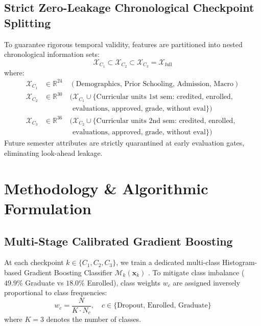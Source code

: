 \documentclass[conference]{IEEEtran}
\begin{document}
\subsection{Strict Zero-Leakage Chronological Checkpoint Splitting}
To guarantee rigorous temporal validity, features are partitioned into nested chronological information sets:
\begin{equation}
    \mathcal{X}_{C_1} \subset \mathcal{X}_{C_2} \subset \mathcal{X}_{C_3} = \mathcal{X}_{\text{full}}
\end{equation}
where:
\begin{align}
    \mathcal{X}_{C_1} &\in \mathbb{R}^{24} \quad (\text{Demographics, Prior Schooling, Admission, Macro}) \nonumber \\
    \mathcal{X}_{C_2} &\in \mathbb{R}^{30} \quad (\mathcal{X}_{C_1} \cup \{\text{Curricular units 1st sem: credited, enrolled,} \nonumber \\
    &\quad\quad\quad\quad \text{evaluations, approved, grade, without eval}\}) \nonumber \\
    \mathcal{X}_{C_3} &\in \mathbb{R}^{36} \quad (\mathcal{X}_{C_2} \cup \{\text{Curricular units 2nd sem: credited, enrolled,} \nonumber \\
    &\quad\quad\quad\quad \text{evaluations, approved, grade, without eval}\}) \nonumber
\end{align}
Future semester attributes are strictly quarantined at early evaluation gates, eliminating look-ahead leakage.

\section{Methodology \& Algorithmic Formulation}

\subsection{Multi-Stage Calibrated Gradient Boosting}
At each checkpoint $k \in \{C_1, C_2, C_3\}$, we train a dedicated multi-class Histogram-based Gradient Boosting Classifier $\mathcal{M}_k(\mathbf{x}_k)$ \cite{ke2017lightgbm}. To mitigate class imbalance ($49.9\%$ Graduate vs $18.0\%$ Enrolled), class weights $w_c$ are assigned inversely proportional to class frequencies:
\begin{equation}
    w_c = \frac{N}{K \cdot N_c}, \quad c \in \{\text{Dropout, Enrolled, Graduate}\}
\end{equation}
where $K=3$ denotes the number of classes.
\end{document}
